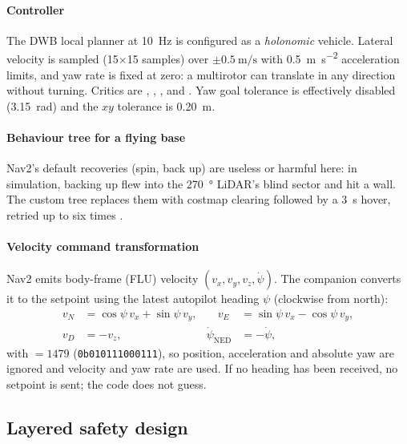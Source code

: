 \paragraph{Controller} The DWB local planner \cite{fox1997dwa} at \SI{10}{\hertz} is
configured as a \emph{holonomic} vehicle. Lateral velocity is sampled (15$\times$15
samples) over $\pm\SI{0.5}{\metre\per\second}$ with
\SI{0.5}{\metre\per\second\squared} acceleration limits, and yaw rate is fixed at zero:
a multirotor can translate in any direction without turning. Critics are
, , ,  and
. Yaw goal tolerance is effectively disabled
(\SI{3.15}{\radian}) and the $xy$ tolerance is \SI{0.20}{\metre}.

\paragraph{Behaviour tree for a flying base} Nav2's default recoveries (spin, back up)
are useless or harmful here: in simulation, backing up flew into the \SI{270}{\degree}
LiDAR's blind sector and hit a wall. The custom tree  replaces them with
costmap clearing followed by a \SI{3}{\second} hover, retried up to six times
\cite{colledanchise2018bt}.

\paragraph{Velocity command transformation} Nav2 emits body-frame (FLU) velocity
$(v_x,v_y,v_z,\dot\psi)$. The companion converts it to the
 setpoint using the latest autopilot heading
$\psi$ (clockwise from north):
\begin{equation}
  \begin{aligned}
  v_N &= \cos\psi\,v_x + \sin\psi\,v_y, &\quad v_E &= \sin\psi\,v_x - \cos\psi\,v_y,\\
  v_D &= -v_z, & \dot\psi_\text{NED} &= -\dot\psi ,
  \end{aligned}
  \label{eq:cmd}
\end{equation}
with  $=1479$ (\texttt{0b010111000111}), so position, acceleration and
absolute yaw are ignored and velocity and yaw rate are used. If no heading has been
received, no setpoint is sent; the code does not guess.

\subsection{Layered safety design}
\label{sec:design-safety}

